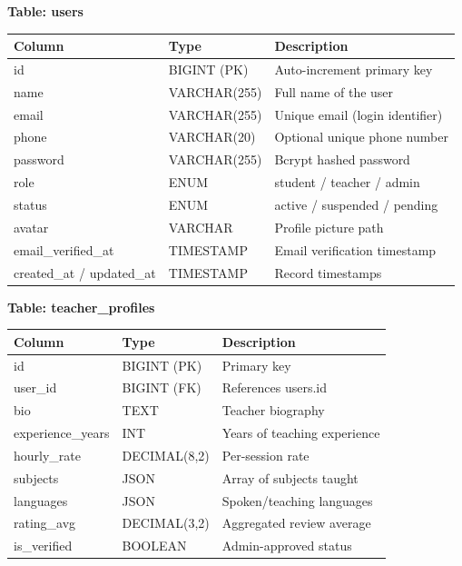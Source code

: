 \documentclass[12pt,a4paper]{report}
\begin{document}
\textbf{Table: users}\\[2pt]
\begin{tabular}{@{}L{3.2cm} L{3cm} L{7cm}@{}}
\toprule
{}\color{white}\textbf{Column} & \color{white}\textbf{Type} & \color{white}\textbf{Description} \\
\midrule
id & BIGINT (PK) & Auto-increment primary key \\
name & VARCHAR(255) & Full name of the user \\
email & VARCHAR(255) & Unique email (login identifier) \\
phone & VARCHAR(20) & Optional unique phone number \\
password & VARCHAR(255) & Bcrypt hashed password \\
role & ENUM & student / teacher / admin \\
status & ENUM & active / suspended / pending \\
avatar & VARCHAR & Profile picture path \\
email\_verified\_at & TIMESTAMP & Email verification timestamp \\
created\_at / updated\_at & TIMESTAMP & Record timestamps \\
\bottomrule
\end{tabular}

\vspace{0.4cm}

\textbf{Table: teacher\_profiles}\\[2pt]
\begin{tabular}{@{}L{3.2cm} L{3cm} L{7cm}@{}}
\toprule
{}\color{white}\textbf{Column} & \color{white}\textbf{Type} & \color{white}\textbf{Description} \\
\midrule
id & BIGINT (PK) & Primary key \\
user\_id & BIGINT (FK) & References users.id \\
bio & TEXT & Teacher biography \\
experience\_years & INT & Years of teaching experience \\
hourly\_rate & DECIMAL(8,2) & Per-session rate  \\
subjects & JSON & Array of subjects taught \\
languages & JSON & Spoken/teaching languages \\
rating\_avg & DECIMAL(3,2) & Aggregated review average \\
is\_verified & BOOLEAN & Admin-approved status \\
\bottomrule
\end{tabular}
\end{document}

